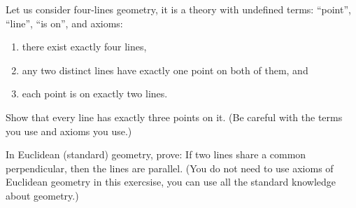 \documentclass[addpoints]{exam}
\begin{document}
  \pagestyle{headandfoot}
  \runningheadrule

  \firstpagefooter{}{}{}
  \runningfooter{}{}{}
  \begin{flushright}

    \vspace{0.2in}
  \end{flushright}

  \begin{questions}
    \question[10]
      Let us consider four-lines geometry, it is a theory with undefined
			terms: ``point'', ``line'', ``is on'', and axioms:
			\begin{enumerate}
			    \item there exist exactly four lines,
			    \item any two distinct lines have exactly one point on both of them, and
			    \item each point is on exactly two lines.
			\end{enumerate}
			
			Show that every line has exactly three points on it.
			(Be careful with the terms you use and axioms you use.)

      \begin{solution}[\stretch{1}]
      \end{solution}
      \newpage
    \question[10]
      In Euclidean (standard) geometry, prove: If two lines share a common
			perpendicular, then the lines are parallel.
			(You do not need to use axioms of Euclidean geometry in this exercsise, you
			can use all the standard knowledge about geometry.)

      \begin{solution}[\stretch{1}]
      \end{solution}
      \newpage
  \end{questions}
\end{document}

